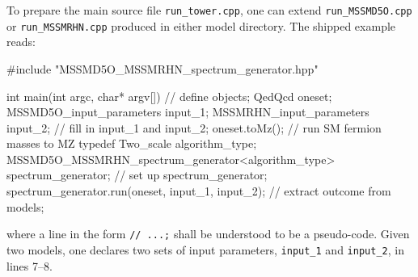 \documentclass[final,3p,11pt,pdflatex]{elsarticle}
\newcommand{\code}[1]{\lstinline|#1|}  %
\begin{document}
To prepare the main source file \code{run_tower.cpp},
one can extend %
\code{run_MSSMD5O.cpp} or \code{run_MSSMRHN.cpp}
produced in either model directory.
The shipped example reads:
\begin{numlstlisting}
#include "MSSMD5O_MSSMRHN_spectrum_generator.hpp"

int main(int argc, char* argv[])
{
  // define objects;
  QedQcd oneset;
  MSSMD5O_input_parameters input_1;
  MSSMRHN_input_parameters input_2;
  // fill in input_1 and input_2;
  oneset.toMz(); // run SM fermion masses to MZ
  typedef Two_scale algorithm_type;
  MSSMD5O_MSSMRHN_spectrum_generator<algorithm_type> spectrum_generator;
  // set up spectrum_generator;
  spectrum_generator.run(oneset, input_1, input_2);
  // extract outcome from models;
}
\end{numlstlisting}
where a line in the form \code{// ...;} shall be understood
to be a pseudo-code.
Given two models,
one declares two sets of input parameters,
\code{input_1} and \code{input_2}, in lines 7--8.
\end{document}
